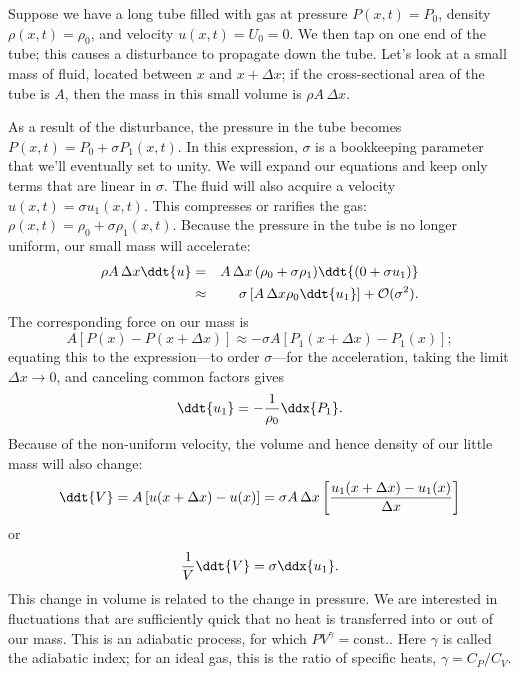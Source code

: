 \begin{sidebar}
\label{b.sound-speed}
Suppose we have a long tube filled with gas at pressure $P(x,t) = P_{0}$, density $\rho(x,t) = \rho_{0}$, and velocity $u(x,t) = U_{0} = 0$. We then tap on one end of the tube; this causes a disturbance to propagate down the tube. Let's look at a small mass of fluid, located between $x$ and $x+\Delta x$; if the cross-sectional area of the tube is $A$, then the mass in this small volume is $\rho A\,\Delta x$.

As a result of the disturbance, the pressure in the tube becomes $P(x,t) = P_{0}+\sigma P_{1}(x,t)$. In this expression, $\sigma$ is a bookkeeping parameter that we'll eventually set to unity. We will expand our equations and keep only terms that are linear in $\sigma$. The fluid will also acquire a velocity $u(x,t) = \sigma u_{1}(x,t)$. This compresses or rarifies the gas: $\rho(x,t) = \rho_{0} + \sigma\rho_{1}(x,t)$.  Because the pressure in the tube is no longer uniform, our small mass will accelerate: 
\begin{eqnarray*}
	\rho A\,\Delta x \ddt{u} &=& A\,\Delta x\,(\rho_{0} + \sigma\rho_{1})\ddt{(0 + \sigma u_{1})}\\
	&\approx& \sigma\left[A\,\Delta x \rho_{0}\ddt{u_{1}}\right] + \mathcal{O}(\sigma^{2}).
\end{eqnarray*}
The corresponding force on our mass is
\[
	A \left[ P(x) - P(x+\Delta x) \right] \approx -\sigma A \left[P_{1}(x+\Delta x)-P_{1}(x)\right];
\]
equating this to the expression---to order $\sigma$---for the acceleration, taking the limit $\Delta x\to 0$, and canceling common factors gives
\begin{equation}\label{e.sound-speed-ut}
	\ddt{u_{1}} = -\frac{1}{\rho_{0}}\ddx{P_{1}}.
\end{equation}
Because of the non-uniform velocity, the volume and hence density of our little mass will also change:
\[
	\ddt{V} = A\left[u(x+\Delta x)-u(x)\right] 
		= \sigma A\,\Delta x\left[\frac{u_{1}(x+\Delta x)-u_{1}(x)}{\Delta x}\right]
\]
or
\begin{equation}\label{e.sound-speed-lnVt}
	\frac{1}{V}\ddt{V} = \sigma \ddx{u_{1}}.
\end{equation}
This change in volume is related to the change in pressure. We are interested in fluctuations that are sufficiently quick that no heat is transferred into or out of our mass. This is an adiabatic process, for which $PV^{\gamma} = \mathrm{const.}$. Here $\gamma$ is called the adiabatic index; for an ideal gas, this is the ratio of specific heats, $\gamma = C_{P}/C_{V}$.


\end{sidebar}
